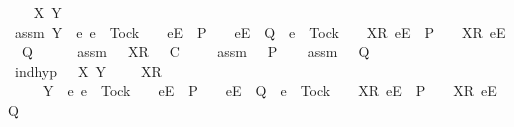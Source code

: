 \begin{isabellebody}
\ \ \isamarkupfalse%
\ X\ Y\isanewline
\ \ \isamarkupfalse%
\ assm{}{\isacharcolon}\ {\isachardoublequoteopen}Y\ {\isasyminter}\ {\isacharbraceleft}e{\isachardot}\ e\ {\isasymnoteq}\ Tock\ {\isasymand}\ {\isasymrho}{\isacharprime}\ {\isacharat}\ {\isacharbrackleft}{\isacharbrackleft}e{\isacharbrackright}\isactrlsub E{\isacharbrackright}\ {\isasymin}\ P\ {\isasymand}\ {\isasymrho}{\isacharprime}\ {\isacharat}\ {\isacharbrackleft}{\isacharbrackleft}e{\isacharbrackright}\isactrlsub E{\isacharbrackright}\ {\isasymin}\ Q\ {\isasymor}\ e\ {\isacharequal}\ Tock\ {\isasymand}\ {\isasymrho}{\isacharprime}\ {\isacharat}\ {\isacharbrackleft}{\isacharbrackleft}X{\isacharbrackright}\isactrlsub R{\isacharcomma}\ {\isacharbrackleft}e{\isacharbrackright}\isactrlsub E{\isacharbrackright}\ {\isasymin}\ P\ {\isasymand}\ {\isasymrho}{\isacharprime}\ {\isacharat}\ {\isacharbrackleft}{\isacharbrackleft}X{\isacharbrackright}\isactrlsub R{\isacharcomma}\ {\isacharbrackleft}e{\isacharbrackright}\isactrlsub E{\isacharbrackright}\ {\isasymin}\ Q{\isacharbraceright}\ {\isacharequal}\ {\isacharbraceleft}{\isacharbraceright}{\isachardoublequoteclose}\isanewline
\ \ \isamarkupfalse%
\ assm{}{\isacharcolon}\ {\isachardoublequoteopen}{\isasymrho}{\isacharprime}\ {\isacharat}\ {\isacharbrackleft}X{\isacharbrackright}\isactrlsub R\ {\isacharhash}\ {\isasymsigma}{\isacharprime}\ {\isasymlesssim}\isactrlsub C\ {\isasymsigma}{\isachardoublequoteclose}\isanewline
\ \ \isamarkupfalse%
\ assm{}{\isacharcolon}\ {\isachardoublequoteopen}{\isasymsigma}\ {\isasymin}\ P{\isachardoublequoteclose}\isanewline
\ \ \isamarkupfalse%
\ assm{}{\isacharcolon}\ {\isachardoublequoteopen}{\isasymsigma}\ {\isasymin}\ Q{\isachardoublequoteclose}\isanewline
\ \ \isamarkupfalse%
\ ind{\isacharunderscore}hyp{\isacharcolon}\ {\isachardoublequoteopen}{\isasymforall}{\isasymrho}\ {\isasymsigma}{\isacharprime}\ X\ Y{\isachardot}\ {\isasymsigma}\ {\isacharequal}\ {\isasymrho}\ {\isacharat}\ {\isacharbrackleft}X{\isacharbrackright}\isactrlsub R\ {\isacharhash}\ {\isasymsigma}{\isacharprime}\isanewline
\ \ \ \ {\isasymand}\ Y\ {\isasyminter}\ {\isacharbraceleft}e{\isachardot}\ e\ {\isasymnoteq}\ Tock\ {\isasymand}\ {\isasymrho}\ {\isacharat}\ {\isacharbrackleft}{\isacharbrackleft}e{\isacharbrackright}\isactrlsub E{\isacharbrackright}\ {\isasymin}\ P\ {\isasymand}\ {\isasymrho}\ {\isacharat}\ {\isacharbrackleft}{\isacharbrackleft}e{\isacharbrackright}\isactrlsub E{\isacharbrackright}\ {\isasymin}\ Q\ {\isasymor}\ e\ {\isacharequal}\ Tock\ {\isasymand}\ {\isasymrho}\ {\isacharat}\ {\isacharbrackleft}{\isacharbrackleft}X{\isacharbrackright}\isactrlsub R{\isacharcomma}\ {\isacharbrackleft}e{\isacharbrackright}\isactrlsub E{\isacharbrackright}\ {\isasymin}\ P\ {\isasymand}\ {\isasymrho}\ {\isacharat}\ {\isacharbrackleft}{\isacharbrackleft}X{\isacharbrackright}\isactrlsub R{\isacharcomma}\ {\isacharbrackleft}e{\isacharbrackright}\isactrlsub E{\isacharbrackright}\ {\isasymin}\ Q{\isacharbraceright}\ {\isacharequal}\ {\isacharbraceleft}{\isacharbraceright}\ {\isasymlongrightarrow}\isanewline

\end{isabellebody}
